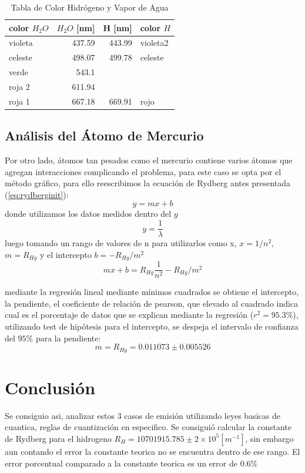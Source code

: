 \documentclass[a4paper,twocolumn,10pt]{article}
\begin{document}
\begin{table}[H]
\centering
\begin{tabular}{|lr|ll|}
\hline
color $H_2O$ & \multicolumn{1}{l|}{$H_2O$ [nm]} & H [nm]  & color $H$     \\
\hline
violeta   & 437.59                      & \multicolumn{1}{r}{443.99} & violeta2   \\
celeste   & 498.07                      & \multicolumn{1}{r}{499.78}  & celeste     \\
verde     & 543.1                       &                              &             \\
roja 2  & 611.94                      &                              &             \\
roja 1 & 667.18                      & \multicolumn{1}{r}{669.91}  & rojo  \\
\hline
\end{tabular}
\caption{Tabla de Color Hidrógeno y Vapor de Agua}
\label{table:watercolor}
\end{table}

\subsection{Análisis del Átomo de Mercurio}
Por otro lado, átomos tan pesados como el mercurio contiene varios átomos que agregan interacciones complicando el problema, para este caso se opta por el método gráfico, para ello reescribimos la ecuación de Rydberg antes presentada (\ref{eq:rydberginit}):
$$
y = m x + b
$$
donde utilizamos los datos medidos dentro del $y$
$$
y = \frac{1}{\lambda}
$$
luego tomando un rango de valores de n para utilizarlos como x, $x = 1/n^2$, $m= R_{Hg}$ y el intercepto $b= - R_{Hg} / m^2$
$$
m x + b = R_{Hg} \frac{1}{n^2} - R_{Hg} / m^2
$$

mediante la regresión lineal mediante mínimos cuadrados se obtiene el intercepto, la pendiente, el coeficiente de relación de pearson, que elevado al cuadrado indica cual es el porcentaje de datos que se explican mediante la regresión ($r^2 = 95.3 \% $), utilizando test de hipótesis para el intercepto, se despeja el intervalo de confianza del $95\%$ para la pendiente:
$$m = R_{Hg} = 0.011073 \pm 0.005526 $$

\section{Conclusión}
Se consiguio asi, analizar estos 3 casos de emisión utilizando leyes basicas de cuantica, reglas de cuantización en especifico. Se consiguió calcular la constante de Rydberg para el hidrogeno $R_H = 10701915.785 \pm 2 \times 10^5 [m^{-1}]$, sin embargo aun contando el error la constante teorica no se encuentra dentro de ese rango. El error porcentual comparado a la constante teorica es un error de $0.6 \%$
\end{document}
